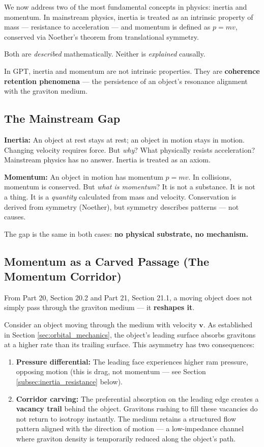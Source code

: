 \documentclass[12pt, a4paper]{article}
\begin{document}
We now address two of the most fundamental concepts in physics: inertia and momentum. In mainstream physics, inertia is treated as an intrinsic property of mass — resistance to acceleration — and momentum is defined as \( p = mv \), conserved via Noether's theorem from translational symmetry.

Both are \textit{described} mathematically. Neither is \textit{explained} causally.

In GPT, inertia and momentum are not intrinsic properties. They are \textbf{coherence retention phenomena} — the persistence of an object's resonance alignment with the graviton medium.

\subsection{The Mainstream Gap}
\label{subsec:inertia_gap_mainstream}

\textbf{Inertia:} An object at rest stays at rest; an object in motion stays in motion. Changing velocity requires force. But \textit{why}? What physically resists acceleration? Mainstream physics has no answer. Inertia is treated as an axiom.

\textbf{Momentum:} An object in motion has momentum \( p = mv \). In collisions, momentum is conserved. But \textit{what is momentum}? It is not a substance. It is not a thing. It is a \textit{quantity} calculated from mass and velocity. Conservation is derived from symmetry (Noether), but symmetry describes patterns — not causes.

The gap is the same in both cases: \textbf{no physical substrate, no mechanism.}

\subsection{Momentum as a Carved Passage (The Momentum Corridor)}
\label{subsec:momentum_corridor}

From Part 20, Section 20.2 and Part 21, Section 21.1, a moving object does not simply pass through the graviton medium — it \textbf{reshapes it}.

Consider an object moving through the medium with velocity \( \mathbf{v} \). As established in Section \ref{sec:orbital_mechanics}, the object's leading surface absorbs gravitons at a higher rate than its trailing surface. This asymmetry has two consequences:

\begin{enumerate}
    \item \textbf{Pressure differential:} The leading face experiences higher ram pressure, opposing motion (this is drag, not momentum — see Section \ref{subsec:inertia_resistance} below).
    \item \textbf{Corridor carving:} The preferential absorption on the leading edge creates a \textbf{vacancy trail} behind the object. Gravitons rushing to fill these vacancies do not return to isotropy instantly. The medium retains a structured flow pattern aligned with the direction of motion — a low-impedance channel where graviton density is temporarily reduced along the object's path.
\end{enumerate}
\end{document}
